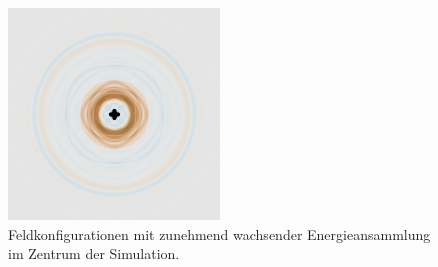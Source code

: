 \begin{figure}
    \begin{center}
        \includegraphics[width=0.5\textwidth]{papers/particles/figures/simulations/particle_frames/frame_02.png}
        \caption{Feldkonfigurationen mit zunehmend wachsender Energieansammlung im Zentrum der Simulation.\ }\label{particles:fig:partikel:wachsen}
    \end{center}
\end{figure}